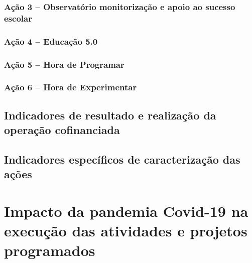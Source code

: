 \documentclass[
]{book}
\theoremstyle{definition}
\theoremstyle{definition}
\theoremstyle{definition}
\theoremstyle{definition}
\theoremstyle{remark}
\begin{document}
\hypertarget{auxe7uxe3o-3-observatuxf3rio-monitorizauxe7uxe3o-e-apoio-ao-sucesso-escolar}{%
\subsection{Ação 3 -- Observatório monitorização e apoio ao sucesso escolar}\label{auxe7uxe3o-3-observatuxf3rio-monitorizauxe7uxe3o-e-apoio-ao-sucesso-escolar}}

\hypertarget{auxe7uxe3o-4-educauxe7uxe3o-5.0}{%
\subsection{Ação 4 -- Educação 5.0}\label{auxe7uxe3o-4-educauxe7uxe3o-5.0}}

\hypertarget{auxe7uxe3o-5-hora-de-programar}{%
\subsection{Ação 5 -- Hora de Programar}\label{auxe7uxe3o-5-hora-de-programar}}

\hypertarget{auxe7uxe3o-6-hora-de-experimentar}{%
\subsection{Ação 6 -- Hora de Experimentar}\label{auxe7uxe3o-6-hora-de-experimentar}}

\hypertarget{indicadores-de-resultado-e-realizauxe7uxe3o-da-operauxe7uxe3o-cofinanciada}{%
\section{Indicadores de resultado e realização da operação cofinanciada}\label{indicadores-de-resultado-e-realizauxe7uxe3o-da-operauxe7uxe3o-cofinanciada}}

\hypertarget{indicadores-especuxedficos-de-caracterizauxe7uxe3o-das-auxe7uxf5es}{%
\section{Indicadores específicos de caracterização das ações}\label{indicadores-especuxedficos-de-caracterizauxe7uxe3o-das-auxe7uxf5es}}

\hypertarget{impacto-da-pandemia-covid-19-na-execuuxe7uxe3o-das-atividades-e-projetos-programados}{%
\chapter{Impacto da pandemia Covid-19 na execução das atividades e projetos programados}\label{impacto-da-pandemia-covid-19-na-execuuxe7uxe3o-das-atividades-e-projetos-programados}}
\end{document}
